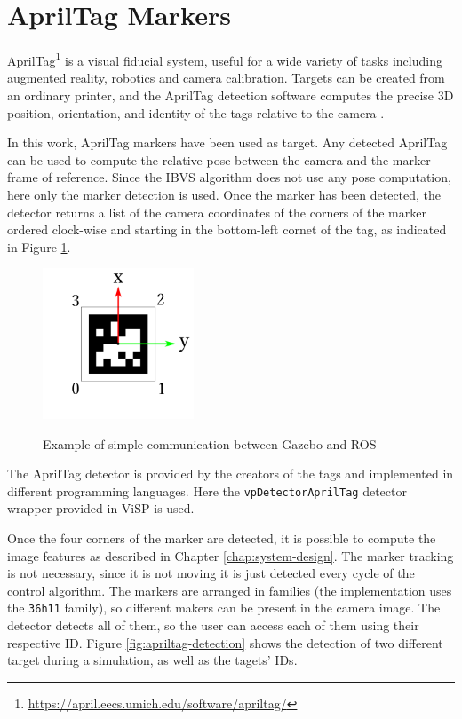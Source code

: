 \section{AprilTag Markers}
\label{sec:apriltag_markers}

AprilTag\footnote{\url{https://april.eecs.umich.edu/software/apriltag/}} is a visual fiducial system, useful for a wide variety of tasks including augmented reality, robotics and camera calibration. Targets can be created from an ordinary printer, and the AprilTag detection software computes the precise 3D position, orientation, and identity of the tags relative to the camera \cite{apriltag_hp}. 

In this work, AprilTag markers have been used as target. Any detected AprilTag can be used to compute the relative pose between the camera and the marker frame of reference. Since the IBVS algorithm does not use any pose computation, here only the marker detection is used. Once the marker has been detected, the detector returns a list of the camera coordinates of the corners of the marker ordered clock-wise and starting in the bottom-left cornet of the tag, as indicated in Figure \ref{fig:april-frames}.

\begin{figure}[!htb]
	\caption{Example of simple communication between Gazebo and ROS}
	\centering
	\includegraphics[width=0.4\textwidth]{content/chapter_05/images/april-frames}
	\label{fig:april-frames}
\end{figure}

The AprilTag detector is provided by the creators of the tags and implemented  in different programming languages. Here the \texttt{vpDetectorAprilTag} detector wrapper provided in ViSP is used. 


Once the four corners of the marker are detected, it is possible to compute the image features as described in Chapter \ref{chap:system-design}. The marker tracking is not necessary, since it is not moving it is just detected every cycle of the control algorithm. The markers are arranged in families (the implementation uses the \texttt{36h11} family), so different makers can be present in the camera image. The detector detects all of them, so the user can access each of them using their respective ID. Figure \ref{fig:apriltag-detection} shows the detection of two different target during a simulation, as well as the tagets' IDs.

